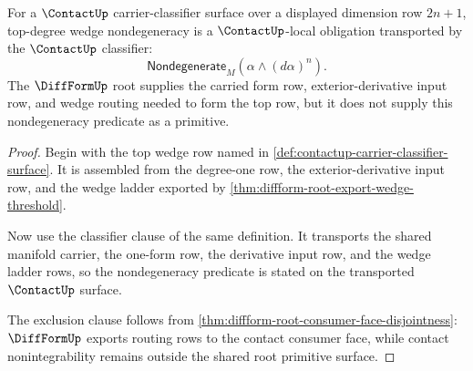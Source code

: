 \begin{theorem}
\label{thm:contactup-nondegeneracy-obligation}
For a $\ContactUp$ carrier-classifier surface over a displayed dimension row $2n+1$, top-degree wedge nondegeneracy is a $\ContactUp$-local obligation transported by the $\ContactUp$ classifier:
$$
\mathsf{Nondegenerate}_{M}(\alpha\wedge(d\alpha)^n).
$$
The $\DiffFormUp$ root supplies the carried form row, exterior-derivative input row, and wedge routing needed to form the top row, but it does not supply this nondegeneracy predicate as a primitive.
\end{theorem}
\begin{proof}
Begin with the top wedge row named in \autoref{def:contactup-carrier-classifier-surface}. It is assembled from the degree-one row, the exterior-derivative input row, and the wedge ladder exported by \autoref{thm:diffform-root-export-wedge-threshold}.

Now use the classifier clause of the same definition. It transports the shared manifold carrier, the one-form row, the derivative input row, and the wedge ladder rows, so the nondegeneracy predicate is stated on the transported $\ContactUp$ surface.

The exclusion clause follows from \autoref{thm:diffform-root-consumer-face-disjointness}: $\DiffFormUp$ exports routing rows to the contact consumer face, while contact nonintegrability remains outside the shared root primitive surface.
\end{proof}

